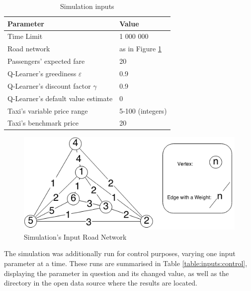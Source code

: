 \begin{table}
\begin{tabular}{ | l | l | }
  \hline
  Parameter & Value \\ \hline
  Time Limit & 1 000 000 \\
  Road network & as in Figure \ref{figure:results:road_network} \\
  Passengers' expected fare & 20 \\
  Q-Learner's greediness \(\varepsilon\) & 0.9 \\
  Q-Learner's discount factor \(\gamma\) & 0.9 \\
  Q-Learner's default value estimate & 0 \\
  Taxi's variable price range & 5-100 (integers) \\
  Taxi's benchmark price & 20 \\
  \hline
\end{tabular}
\caption{
  Simulation inputs
  \label{table:input_data}
}
\end{table}

\begin{figure}
\begin{center}
  \includegraphics[width=\textwidth]{../figures/road_network}
  \caption{
    Simulation's Input Road Network
    \label{figure:results:road_network}
  }
\end{center}
\end{figure}

The simulation was additionally run for control purposes, varying one input
parameter at a time. These runs are summarised in Table
\ref{table:inputs:control}, displaying the parameter in question and its
changed value, as well as the directory in the open data source where the
results are located.

